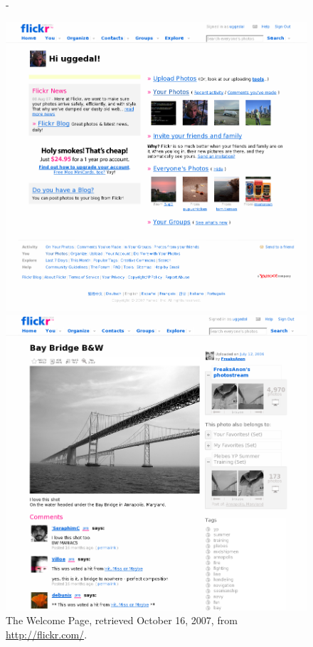 \begin{figure}
  \captionstyle{\raggedright}
  \centering
  \strictpagechecktrue
  \begin{adjustwidth*}{0em}{-\wholemargin}
    \begin{minipage}[t]{0.475\wholewidth}
      \includegraphics[width=1\textwidth]{scrsh_flickr_welcome}
      \caption[Flickr Welcome Page]{%
         The Welcome Page,
         retrieved October 16, 2007, from \url{http://flickr.com/}.}
      \label{figure:scrsh.flickr.welcome}
    \end{minipage}
    \hfill
    \begin{minipage}[t]{0.475\wholewidth}
      \includegraphics[width=1\textwidth]{scrsh_flickr_photo_detail}

\end{minipage}
\end{adjustwidth*}
\end{figure}
